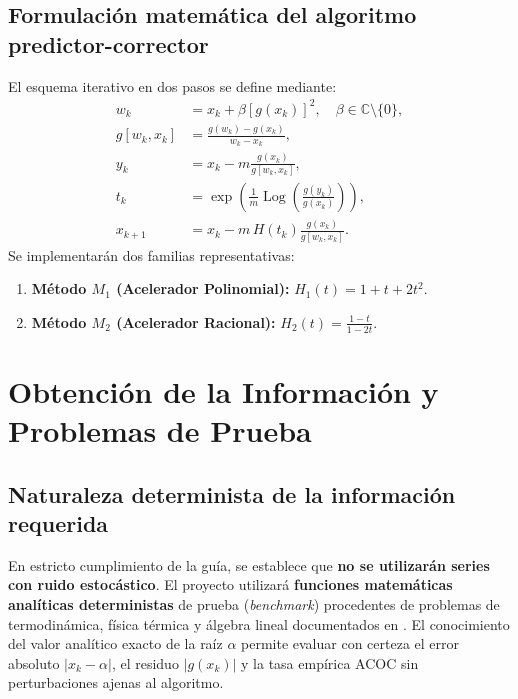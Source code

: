 \documentclass[10pt, a4paper]{article}
\begin{document}
\subsection{Formulación matemática del algoritmo predictor-corrector}
El esquema iterativo en dos pasos se define mediante:
\begin{align}
    w_k &= x_k + \beta [g(x_k)]^2, \quad \beta \in \mathbb{C} \setminus \{0\}, \label{eq:wk} \\[1pt]
    g[w_k, x_k] &= \frac{g(w_k) - g(x_k)}{w_k - x_k}, \label{eq:dd} \\[1pt]
    y_k &= x_k - m \frac{g(x_k)}{g[w_k, x_k]}, \label{eq:yk} \\[1pt]
    t_k &= \exp\left( \frac{1}{m} \operatorname{Log}\left(\frac{g(y_k)}{g(x_k)}\right) \right), \label{eq:tk} \\[1pt]
    x_{k+1} &= x_k - m \, H(t_k) \frac{g(x_k)}{g[w_k, x_k]}. \label{eq:xk1}
\end{align}
Se implementarán dos familias representativas:
\begin{enumerate}
    \item \textbf{Método $M_1$ (Acelerador Polinomial):} $H_1(t) = 1 + t + 2t^2$.
    \item \textbf{Método $M_2$ (Acelerador Racional):} $H_2(t) = \frac{1 - t}{1 - 2t}$.
\end{enumerate}



\section{Obtención de la Información y Problemas de Prueba}

\subsection{Naturaleza determinista de la información requerida}
En estricto cumplimiento de la guía, se establece que \textbf{no se utilizarán series con ruido estocástico}. El proyecto utilizará \textbf{funciones matemáticas analíticas deterministas} de prueba (\textit{benchmark}) procedentes de problemas de termodinámica, física térmica y álgebra lineal documentados en \cite{Jerezano2026}. El conocimiento del valor analítico exacto de la raíz $\alpha$ permite evaluar con certeza el error absoluto $|x_k - \alpha|$, el residuo $|g(x_k)|$ y la tasa empírica ACOC sin perturbaciones ajenas al algoritmo.
\end{document}
